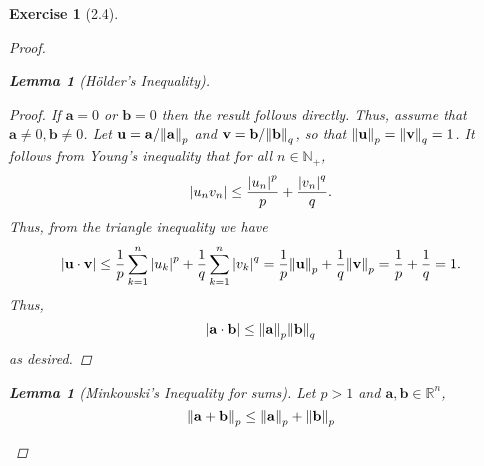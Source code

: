 \documentclass[11pt]{article}
\newtheorem{lemma}[theorem]{Lemma}
\newtheorem{exercise}{Exercise}
\newcommand*{\myproofname}{Proof}
\newenvironment{subproof}[1][\myproofname]{\begin{proof}[#1]\renewcommand*{\qedsymbol}{$\mathbin{/\mkern-6mu/}$}}{\end{proof}}
\newcommand{\R}{\mathbb{R}}
\newcommand{\f}[2]{\frac{#1}{#2}}
\begin{document}
\begin{exercise}[2.4]
\begin{proof}
\begin{lemma}[H\"{o}lder's Inequality]
			\begin{subproof}
				If $\mathbf{a} = 0$ or $\mathbf{b} = 0$ then the result follows directly. Thus, assume that $\mathbf{a} \neq 0, \mathbf{b} \neq 0$. Let $\mathbf{u} = \mathbf{a}/\norm{\mathbf{a}}_p$ and $\mathbf{v} = \mathbf{b}/\norm{\mathbf{b}}_q$, so that $\norm{\mathbf{u}}_p = \norm{\mathbf{v}}_q = 1$.  It follows from Young's inequality that for all $n\in \mathbb{N}_+$, 
				\begin{equation*}
				\abs{u_n v_n} \leq \f{\abs{u_n}^p}{p} + \f{\abs{v_n}^q}{q}.
				\end{equation*}
				Thus, from the triangle inequality we have
				\begin{equation*}
				\abs{\bf{u}\cdot \bf{v}} \leq \f{1}{p}\sum^n_{k=1}\abs{u_k}^p + \f{1}{q}\sum^n_{k=1}\abs{v_k}^q = \f{1}{p}\norm{\mathbf{u}}_p + \f{1}{q}\norm{\mathbf{v}}_p = \f{1}{p} + \f{1}{q} = 1.
				\end{equation*}
				Thus, 
				\begin{equation*}
				\abs{\mathbf{a}\cdot \mathbf{b}} \leq \norm{\bf{a}}_p \norm{\bf{b}}_q
				\end{equation*}
				as desired. 
			\end{subproof}
		\end{lemma}
	
		\begin{lemma}[Minkowski's Inequality for sums]
			Let $p>1$ and $\mathbf{a}, \mathbf{b} \in \R^n$,
			\begin{equation*}
			\norm{\mathbf{a} + \mathbf{b}}_p \leq \norm{\mathbf{a}}_p + \norm{\mathbf{b}}_p
			\end{equation*}
			

\end{lemma}
\end{proof}
\end{exercise}
\end{document}
